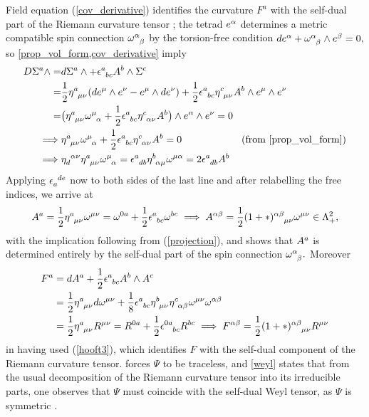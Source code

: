 \documentclass[a4paper,12pt, onecolumn, notitlepage]{article}
\theoremstyle{definition}
\theoremstyle{remark}
\newcommand{\al}{\alpha}
\newcommand{\w}{\omega}
\newcommand{\m}{\mu}
\newcommand{\n}{\nu}
\newcommand{\e}{\epsilon}
\newcommand{\hooft}[3]{\eta\indices{^{#1}_{#2}_{#3}}}
\newcommand{\ihooft}[3]{\eta\indices{_{#1}^{#2}^{#3}}}
\begin{document}
Field equation (\ref{cov_derivative}) identifies the curvature $F^{a}$ with the self-dual part of the Riemann curvature tensor \cite{capovilla_1993}; the tetrad $e\indices{^\al}$ determines a metric compatible spin connection $\w\indices{^\al_\beta}$ by the torsion-free condition $de\indices{^\al} + \w\indices{^\al_\beta}\wedge e\indices{^\beta}=0,$ so \cref{prop_vol_form,cov_derivative} imply
\begin{align*}
	D\Sigma\indices{^a}\wedge =& d\Sigma\indices{^a}\wedge + \e\indices{^a_b_c}A\indices{^b}\wedge\Sigma\indices{^c}\\
	=&\frac{1}{2}\hooft{a}{\m}{\n}(de\indices{^\m}\wedge e\indices{^\n} - e\indices{^\m}\wedge de\indices{^\n}) +\frac{1}{2}\e\indices{^a_b_c}\hooft{c}{\m}{\n}A^{b}\wedge e^{\m}\wedge e^{\n}\\
	=&\big(\hooft{a}{\m}{\n}\w\indices{^\m_\al} +\frac{1}{2}\e\indices{^a_b_c}\hooft{c}{\al}{\n}A^{b}\big)\wedge e^{\al}\wedge e^{\n}=0\\
	\implies& \hooft{a}{\m}{\n}\w\indices{^\m_\al} +\frac{1}{2}\e\indices{^a_b_c}\hooft{c}{\al}{\n}A^{b}=0\qquad\qquad\qquad (\text{from \ref{prop_vol_form})}\\
	\implies& \ihooft{d}{\al}{\n}\hooft{a}{\m}{\n}\w\indices{^\m_\al}=\e\indices{^a_d_b}\hooft{b}{\al}{\m}\w\indices{^\m^\al}=2\e\indices{^a_d_b}A^{b}
\end{align*}
Applying $\e\indices{_a^d^e}$ now to both sides of the last line and after relabelling the free indices, we arrive at
\begin{align*}
	A\indices{^a}=\frac{1}{2}\hooft{a}{\m}{\n}\w\indices{^\m^\n} = \w\indices{^0^a} + \frac{1}{2} \e\indices{^a_b_c}\w\indices{^b^c}
	\implies A^{\al\beta} = \frac{1}{2}(1+\ast)\indices{^\al^\beta_\m_\n}\w\indices{^\m^\n}\in\Lambda^{2}_{+},
\end{align*}
with the implication following from (\ref{projection}), and shows that $A\indices{^a}$ is determined entirely by the self-dual part of the spin connection $\w\indices{^\al_\beta}.$ Moreover
\begin{align*}
	F\indices{^a} &= dA\indices{^a} + \frac{1}{2}\e\indices{^a_b_c}A\indices{^b}\wedge A\indices{^c}\\
	&=\frac{1}{2}\hooft{a}{\m}{\n}d\w\indices{^\m^\n}+\frac{1}{8}\e\indices{^a_b_c}\hooft{b}{\m}{\n}\hooft{c}{\al}{\beta}\w\indices{^\m^\n} \w\indices{^\al^\beta}\\
	&=\frac{1}{2}\hooft{a}{\m}{\n}R\indices{^\m^\n}= R^{0a}+\frac{1}{2}\e\indices{^0^a_b_c}R^{bc}
	\implies F\indices{^\al^\beta} = \frac{1}{2}(1+\ast)\indices{^\al^\beta_\m_\n}R\indices{^\m^\n}
\end{align*}
in having used (\ref{hooft3}), which identifies $F$ with the self-dual component of the Riemann curvature tensor.  forces $\Psi$ to be traceless, and \cref{weyl} states that from the usual decomposition of the Riemann curvature tensor into its irreducible parts, one observes that $\Psi$ must coincide with the self-dual Weyl tensor, as $\Psi$ is symmetric \cite{capovilla_1993}.\\
	
\end{document}
